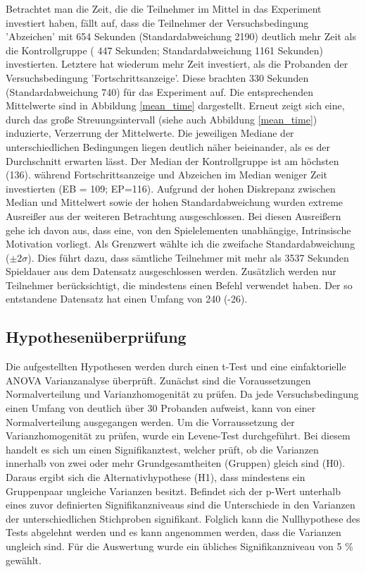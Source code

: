 Betrachtet man die Zeit, die die Teilnehmer im Mittel in das Experiment investiert haben, fällt auf, dass die Teilnehmer der Versuchsbedingung 'Abzeichen' mit 654 Sekunden (Standardabweichung 2190) deutlich mehr Zeit als die Kontrollgruppe ( 447 Sekunden; Standardabweichung 1161 Sekunden) investierten. Letztere hat wiederum mehr Zeit investiert, als die Probanden der Versuchsbedingung 'Fortschrittsanzeige'. Diese brachten 330 Sekunden (Standardabweichung 740) für das Experiment auf. Die entsprechenden Mittelwerte sind in Abbildung \ref{mean_time} dargestellt. Erneut zeigt sich eine, durch das große Streuungsintervall (siehe auch Abbildung \ref{mean_time}) induzierte, Verzerrung der Mittelwerte. Die jeweiligen Mediane der unterschiedlichen Bedingungen liegen deutlich näher beieinander, als es der Durchschnitt erwarten lässt. Der Median der Kontrollgruppe ist am höchsten (136). während Fortschrittsanzeige und Abzeichen im Median weniger Zeit investierten (EB = 109; EP=116).
Aufgrund der hohen Diskrepanz zwischen Median und Mittelwert sowie der hohen Standardabweichung wurden extreme Ausreißer aus der weiteren Betrachtung ausgeschlossen. Bei diesen Ausreißern gehe ich davon aus, dass eine, von den Spielelementen unabhängige, Intrinsische Motivation vorliegt. Als Grenzwert wählte ich die zweifache Standardabweichung ($\pm 2\sigma$). Dies führt dazu, dass sämtliche Teilnehmer mit mehr als 3537 Sekunden Spieldauer aus dem Datensatz ausgeschlossen werden. Zusätzlich werden nur Teilnehmer berücksichtigt, die mindestens einen Befehl verwendet haben. Der so entstandene Datensatz hat einen Umfang von 240 (-26).

\subsection{Hypothesenüberprüfung}\label{hypo}
Die aufgestellten Hypothesen werden durch einen t-Test und eine einfaktorielle  ANOVA  Varianzanalyse überprüft. Zunächst sind die Voraussetzungen Normalverteilung und Varianzhomogenität zu prüfen. Da jede Versuchsbedingung einen Umfang von deutlich über 30 Probanden aufweist, kann von einer Normalverteilung ausgegangen werden. Um die Vorraussetzung der Varianzhomogenität zu prüfen, wurde ein Levene-Test durchgeführt. Bei diesem handelt es sich um einen Signifikanztest, welcher prüft, ob die Varianzen innerhalb von zwei oder mehr Grundgesamtheiten (Gruppen) gleich sind (H0). Daraus ergibt sich die Alternativhypothese (H1), dass mindestens ein Gruppenpaar ungleiche Varianzen besitzt. Befindet sich der p-Wert unterhalb  eines zuvor definierten Signifikanzniveaus sind die Unterschiede in den Varianzen der unterschiedlichen Stichproben signifikant. Folglich kann die Nullhypothese des Tests abgelehnt werden und es kann angenommen werden, dass die Varianzen ungleich sind. Für die Auswertung wurde ein übliches Signifikanzniveau von 5 \% gewählt.

